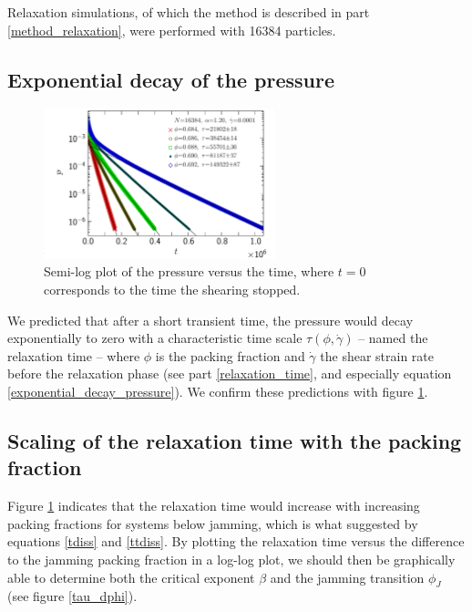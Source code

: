 \documentclass[class=report, float=false, crop=false]{standalone}
\begin{document}
Relaxation simulations, of which the method is described in part \ref{method_relaxation}, were performed with 16384 particles.

\subsection{Exponential decay of the pressure}

\begin{figure}[h!]
\centering
\includegraphics[width=0.6\textwidth]{figures/figs/pe_t_16384_EL120_GDh100}
\caption{Semi-log plot of the pressure versus the time, where $t=0$ corresponds to the time the shearing stopped.}
\label{pe_t_16384_EL120_GDh100}
\end{figure}

We predicted that after a short transient time, the pressure would decay exponentially to zero with a characteristic time scale $\tau(\phi,\dot{\gamma})$ -- named the relaxation time -- where $\phi$ is the packing fraction and $\dot{\gamma}$ the shear strain rate before the relaxation phase (see part \ref{relaxation_time}, and especially equation \ref{exponential_decay_pressure}). We confirm these predictions with figure \ref{pe_t_16384_EL120_GDh100}.

\subsection{Scaling of the relaxation time with the packing fraction}

Figure \ref{pe_t_16384_EL120_GDh100} indicates that the relaxation time would increase with increasing packing fractions for systems below jamming, which is what suggested by equations \ref{tdiss} and \ref{ttdiss}. By plotting the relaxation time versus the difference to the jamming packing fraction in a log-log plot, we should then be graphically able to determine both the critical exponent $\beta$ and the jamming transition $\phi_J$ (see figure \ref{tau_dphi}).
\end{document}
